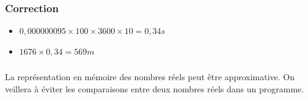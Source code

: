\documentclass[svgnames,11pt]{beamer}
\begin{document}
\begin{frame}
    \frametitle{Correction}

    \begin{itemize}
        \item $0,000000095×100×3600×10=0,34s$
        \item $1676×0,34 = 569m$
    \end{itemize}

\end{frame}
\begin{frame}
    \frametitle{}

    \begin{aretenir}[]
    La représentation en mémoire des nombres réels peut être approximative. On veillera à éviter les comparaisons entre deux nombres réels dans un programme.
    \end{aretenir}

\end{frame}
\end{document}
